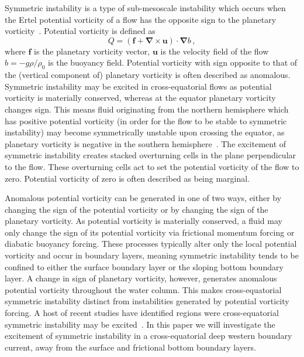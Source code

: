 Symmetric instability is a type of sub-mesoscale instability which occurs when the Ertel potential vorticity of a flow has the opposite sign to the planetary vorticity~\cite{Stone1966, Hoskins1974}.  Potential vorticity is defined as
\begin{equation}
    Q = (\mathbf{f} + \mathbf{\nabla} \times \mathbf{u}) \cdot \mathbf{\nabla}b \, ,
\end{equation}
where $\mathbf{f}$ is the planetary vorticity vector, $\mathbf{u}$ is the velocity field of the flow $b = - g \rho / \rho_0$ is the buoyancy field. Potential vorticity with sign opposite to that of the (vertical component of) planetary vorticity is often described as anomalous. Symmetric instability may be excited in cross-equatorial flows as potential vorticity is materially conserved, whereas at the equator planetary vorticity changes sign. This means fluid originating from the northern hemisphere which has positive potential vorticity (in order for the flow to be stable to symmetric instability) may become symmetrically unstable upon crossing the equator, as planetary vorticity is negative in the southern hemisphere~\cite{Goldsworth2021}. The excitement of symmetric instability creates stacked overturning cells in the plane perpendicular to the flow. These overturning cells act to set the potential vorticity of the flow to zero. Potential vorticity of zero is often described as being marginal.

Anomalous potential vorticity can be generated in one of two ways, either by changing the sign of the potential vorticity or by changing the sign of the planetary vorticity. As potential vorticity is materially conserved, a fluid may only change the sign of its potential vorticity via frictional momentum forcing or diabatic buoyancy forcing. These processes typically alter only the local potential vorticity and occur in boundary layers, meaning symmetric instability tends to be confined to either the surface boundary layer or the sloping bottom boundary layer. A change in sign of planetary vorticity, however, generates anomalous potential vorticity throughout the water column. This makes cross-equatorial symmetric instability distinct from instabilities generated by potential vorticity forcing. A host of recent studies have identified regions were cross-equatorial symmetric instability may be excited~\cite{Goldsworth2021, Forryan2021,Zhou2022,Jakoboski2019}. In this paper we will investigate the excitement of symmetric instability in a cross-equatorial deep western boundary current, away from the surface and frictional bottom boundary layers.

